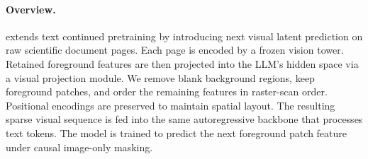 
\paragraph{Overview.}
\methodname extends text continued pretraining by introducing next visual latent prediction on raw scientific document pages.
Each page is encoded by a frozen vision tower. 
Retained foreground features are then projected into the LLM's hidden space via a visual projection module.
We remove blank background regions, keep foreground patches, and order the remaining features in raster-scan order. 
Positional encodings are preserved to maintain spatial layout. 
The resulting sparse visual sequence is fed into the same autoregressive backbone that processes text tokens.
The model is trained to predict the next foreground patch feature under causal image-only masking.


